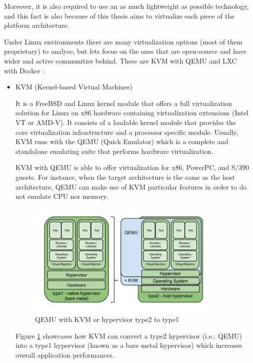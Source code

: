 Moreover, it is also required to use an as much lightweight as possible technology, and this fact is also because of this thesis aims to virtualize each piece of the platform architecture.

Under Linux environments there are many virtualization options (most of them proprietary) to analyse, but lets focus on the ones that are open-source and have wider and active communities behind. These are KVM \cite{kvm} with QEMU \cite{qemu} and LXC \cite{lxc} with Docker \cite{docker}:

\begin{itemize}
\item KVM (Kernel-based Virtual Machines) \hfill

It is a FreeBSD and Linux kernel module that offers a full virtualization solution for Linux on x86 hardware containing virtualization extensions (Intel VT or AMD-V). It consists of a loadable kernel module that provides the core virtualization infrastructure and a processor specific module.
Usually, KVM runs with the QEMU (Quick Emulator) which is a complete and standalone emulating suite that performs hardware virtualization.

KVM with QEMU is able to offer virtualization for x86, PowerPC, and S/390 guests. For instance, when the target architecture is the same as the host architecture, QEMU can make use of KVM particular features in order to do not emulate CPU nor memory.

\begin{figure}[!htb]
\begin{center}
\includegraphics[width=0.9\textwidth]{./images/KVM.png}
\caption{QEMU with KVM or hypervisor type2 to type1}
\label{F:KVMandQEMU}
\end{center}
\end{figure}

Figure \ref{F:KVMandQEMU} showcases how KVM can convert a type2 hypervisor (i.e.: QEMU) into a type1 hypervisor (known as a bare metal hypervisor) which increases overall application performances. 


\end{itemize}

